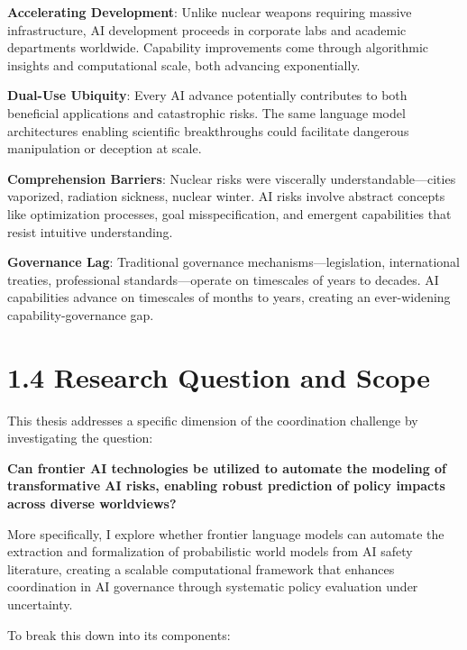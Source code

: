 \documentclass[
  11pt,
  letterpaper,
]{book}
\begin{document}
\textbf{Accelerating Development}: Unlike nuclear weapons requiring
massive infrastructure, AI development proceeds in corporate labs and
academic departments worldwide. Capability improvements come through
algorithmic insights and computational scale, both advancing
exponentially.

\textbf{Dual-Use Ubiquity}: Every AI advance potentially contributes to
both beneficial applications and catastrophic risks. The same language
model architectures enabling scientific breakthroughs could facilitate
dangerous manipulation or deception at scale.

\textbf{Comprehension Barriers}: Nuclear risks were viscerally
understandable---cities vaporized, radiation sickness, nuclear winter.
AI risks involve abstract concepts like optimization processes, goal
misspecification, and emergent capabilities that resist intuitive
understanding.

\textbf{Governance Lag}: Traditional governance
mechanisms---legislation, international treaties, professional
standards---operate on timescales of years to decades. AI capabilities
advance on timescales of months to years, creating an ever-widening
capability-governance gap.

\section*{1.4 Research Question and Scope}\label{sec-research-question}


This thesis addresses a specific dimension of the coordination challenge
by investigating the question:

\textbf{Can frontier AI technologies be utilized to automate the
modeling of transformative AI risks, enabling robust prediction of
policy impacts across diverse worldviews?}

More specifically, I explore whether frontier language models can
automate the extraction and formalization of probabilistic world models
from AI safety literature, creating a scalable computational framework
that enhances coordination in AI governance through systematic policy
evaluation under uncertainty.

To break this down into its components:
\end{document}
